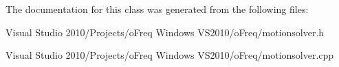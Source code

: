 The documentation for this class was generated from the following files\-:\begin{DoxyCompactItemize}
\item 
Visual Studio 2010/\-Projects/o\-Freq Windows V\-S2010/o\-Freq/motionsolver.\-h\item 
Visual Studio 2010/\-Projects/o\-Freq Windows V\-S2010/o\-Freq/motionsolver.\-cpp\end{DoxyCompactItemize}

